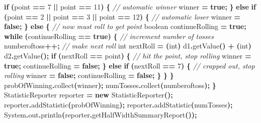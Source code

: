 \documentclass[
]{book}
\newenvironment{Shaded}{\begin{snugshade}}{\end{snugshade}}
\newcommand{\BuiltInTok}[1]{#1}
\newcommand{\CommentTok}[1]{\textcolor[rgb]{0.56,0.35,0.01}{\textit{#1}}}
\newcommand{\ControlFlowTok}[1]{\textcolor[rgb]{0.13,0.29,0.53}{\textbf{#1}}}
\newcommand{\DataTypeTok}[1]{\textcolor[rgb]{0.13,0.29,0.53}{#1}}
\newcommand{\DecValTok}[1]{\textcolor[rgb]{0.00,0.00,0.81}{#1}}
\newcommand{\FunctionTok}[1]{\textcolor[rgb]{0.00,0.00,0.00}{#1}}
\newcommand{\KeywordTok}[1]{\textcolor[rgb]{0.13,0.29,0.53}{\textbf{#1}}}
\newcommand{\NormalTok}[1]{#1}
\newcommand{\OperatorTok}[1]{\textcolor[rgb]{0.81,0.36,0.00}{\textbf{#1}}}
\theoremstyle{definition}
\theoremstyle{definition}
\theoremstyle{definition}
\theoremstyle{definition}
\theoremstyle{remark}
\begin{document}
\begin{Shaded}
\begin{Highlighting}[]
    \ControlFlowTok{if} \OperatorTok{(}\NormalTok{point }\OperatorTok{==} \DecValTok{7} \OperatorTok{||}\NormalTok{ point }\OperatorTok{==} \DecValTok{11}\OperatorTok{)} \OperatorTok{\{}
        \CommentTok{// automatic winner}
\NormalTok{        winner }\OperatorTok{=} \KeywordTok{true}\OperatorTok{;}
    \OperatorTok{\}} \ControlFlowTok{else} \ControlFlowTok{if} \OperatorTok{(}\NormalTok{point }\OperatorTok{==} \DecValTok{2} \OperatorTok{||}\NormalTok{ point }\OperatorTok{==} \DecValTok{3} \OperatorTok{||}\NormalTok{ point }\OperatorTok{==} \DecValTok{12}\OperatorTok{)} \OperatorTok{\{}
        \CommentTok{// automatic loser}
\NormalTok{        winner }\OperatorTok{=} \KeywordTok{false}\OperatorTok{;}
    \OperatorTok{\}} \ControlFlowTok{else} \OperatorTok{\{} \CommentTok{// now must roll to get point}
        \DataTypeTok{boolean}\NormalTok{ continueRolling }\OperatorTok{=} \KeywordTok{true}\OperatorTok{;}
        \ControlFlowTok{while} \OperatorTok{(}\NormalTok{continueRolling }\OperatorTok{==} \KeywordTok{true}\OperatorTok{)} \OperatorTok{\{}
            \CommentTok{// increment number of tosses}
\NormalTok{            numberoftoss}\OperatorTok{++;} 
            \CommentTok{// make next roll}
            \DataTypeTok{int}\NormalTok{ nextRoll }\OperatorTok{=} \OperatorTok{(}\DataTypeTok{int}\OperatorTok{)}\NormalTok{ d1}\OperatorTok{.}\FunctionTok{getValue}\OperatorTok{()} \OperatorTok{+} \OperatorTok{(}\DataTypeTok{int}\OperatorTok{)}\NormalTok{ d2}\OperatorTok{.}\FunctionTok{getValue}\OperatorTok{();}
            \ControlFlowTok{if} \OperatorTok{(}\NormalTok{nextRoll }\OperatorTok{==}\NormalTok{ point}\OperatorTok{)} \OperatorTok{\{}
                \CommentTok{// hit the point, stop rolling}
\NormalTok{                winner }\OperatorTok{=} \KeywordTok{true}\OperatorTok{;}
\NormalTok{                continueRolling }\OperatorTok{=} \KeywordTok{false}\OperatorTok{;}
            \OperatorTok{\}} \ControlFlowTok{else} \ControlFlowTok{if} \OperatorTok{(}\NormalTok{nextRoll }\OperatorTok{==} \DecValTok{7}\OperatorTok{)} \OperatorTok{\{}
                \CommentTok{// crapped out, stop rolling}
\NormalTok{                winner }\OperatorTok{=} \KeywordTok{false}\OperatorTok{;}
\NormalTok{                continueRolling }\OperatorTok{=} \KeywordTok{false}\OperatorTok{;}
            \OperatorTok{\}}
        \OperatorTok{\}}
    \OperatorTok{\}}
\NormalTok{    probOfWinning}\OperatorTok{.}\FunctionTok{collect}\OperatorTok{(}\NormalTok{winner}\OperatorTok{);}
\NormalTok{    numTosses}\OperatorTok{.}\FunctionTok{collect}\OperatorTok{(}\NormalTok{numberoftoss}\OperatorTok{);}
\OperatorTok{\}}
\NormalTok{StatisticReporter reporter }\OperatorTok{=} \KeywordTok{new} \FunctionTok{StatisticReporter}\OperatorTok{();}
\NormalTok{reporter}\OperatorTok{.}\FunctionTok{addStatistic}\OperatorTok{(}\NormalTok{probOfWinning}\OperatorTok{);}
\NormalTok{reporter}\OperatorTok{.}\FunctionTok{addStatistic}\OperatorTok{(}\NormalTok{numTosses}\OperatorTok{);}
\BuiltInTok{System}\OperatorTok{.}\FunctionTok{out}\OperatorTok{.}\FunctionTok{println}\OperatorTok{(}\NormalTok{reporter}\OperatorTok{.}\FunctionTok{getHalfWidthSummaryReport}\OperatorTok{());}
\end{Highlighting}
\end{Shaded}
\end{document}

